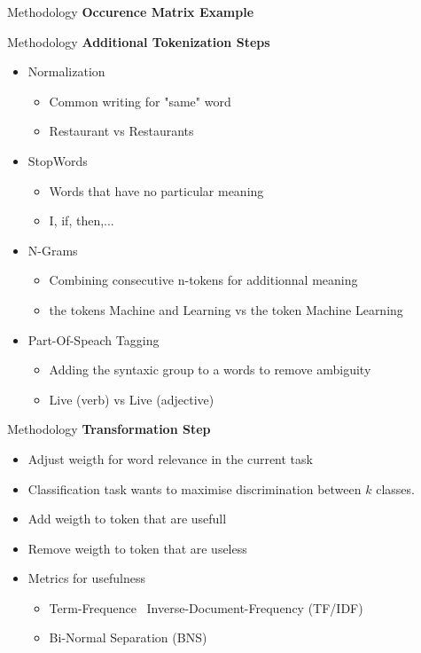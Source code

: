 \begin{frame}[label=metho]{Methodology}
	\textbf{Occurence Matrix Example}
\end{frame}

\begin{frame}[label=metho]{Methodology}
	\textbf{Additional Tokenization Steps}
	\begin{itemize}
		\item Normalization
		\begin{itemize}
			\item Common writing for "same" word
			\item Restaurant vs Restaurants
		\end{itemize}
		
		\item StopWords
		\begin{itemize}
			\item Words that have no particular meaning
			\item I, if, then,...
		\end{itemize}
		
		\item N-Grams
		\begin{itemize}
			\item Combining consecutive n-tokens for additionnal meaning
			\item the tokens Machine and Learning vs the token Machine Learning
		\end{itemize}
		
		\item Part-Of-Speach Tagging
		\begin{itemize}
			\item Adding the syntaxic group to a words to remove ambiguity
			\item Live (verb) vs Live (adjective)
		\end{itemize}
		
	\end{itemize}
\end{frame}



\begin{frame}[label=metho]{Methodology}
	\textbf{Transformation Step}
	\begin{itemize}
		\item Adjust weigth for word relevance in the current task
		\item Classification task wants to maximise discrimination between $k$ classes.
		\item Add weigth to token that are usefull
		\item Remove weigth to token that are useless
		\item Metrics for usefulness
		\begin{itemize}
			\item Term-Frequence \ Inverse-Document-Frequency (TF/IDF)
			\item Bi-Normal Separation (BNS)
		\end{itemize}
	\end{itemize}
\end{frame}


